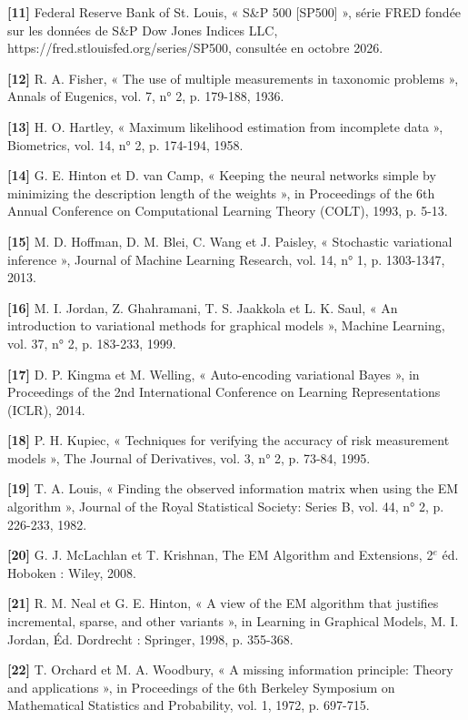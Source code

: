\textbf{[11]  }Federal Reserve Bank of St. Louis, « S\&P 500 [SP500] », série FRED fondée sur les données de S\&P Dow Jones Indices LLC, https://fred.stlouisfed.org/series/SP500, consultée en octobre 2026.

\textbf{[12]  }R. A. Fisher, « The use of multiple measurements in taxonomic problems », Annals of Eugenics, vol. 7, n° 2, p. 179-188, 1936.

\textbf{[13]  }H. O. Hartley, « Maximum likelihood estimation from incomplete data », Biometrics, vol. 14, n° 2, p. 174-194, 1958.

\textbf{[14]  }G. E. Hinton et D. van Camp, « Keeping the neural networks simple by minimizing the description length of the weights », in Proceedings of the 6th Annual Conference on Computational Learning Theory (COLT), 1993, p. 5-13.

\textbf{[15]  }M. D. Hoffman, D. M. Blei, C. Wang et J. Paisley, « Stochastic variational inference », Journal of Machine Learning Research, vol. 14, n° 1, p. 1303-1347, 2013.

\textbf{[16]  }M. I. Jordan, Z. Ghahramani, T. S. Jaakkola et L. K. Saul, « An introduction to variational methods for graphical models », Machine Learning, vol. 37, n° 2, p. 183-233, 1999.

\textbf{[17]  }D. P. Kingma et M. Welling, « Auto-encoding variational Bayes », in Proceedings of the 2nd International Conference on Learning Representations (ICLR), 2014.

\textbf{[18]  }P. H. Kupiec, « Techniques for verifying the accuracy of risk measurement models », The Journal of Derivatives, vol. 3, n° 2, p. 73-84, 1995.

\textbf{[19]  }T. A. Louis, « Finding the observed information matrix when using the EM algorithm », Journal of the Royal Statistical Society: Series B, vol. 44, n° 2, p. 226-233, 1982.

\textbf{[20]  }G. J. McLachlan et T. Krishnan, The EM Algorithm and Extensions, 2$^{e}$ éd. Hoboken : Wiley, 2008.

\textbf{[21]  }R. M. Neal et G. E. Hinton, « A view of the EM algorithm that justifies incremental, sparse, and other variants », in Learning in Graphical Models, M. I. Jordan, Éd. Dordrecht : Springer, 1998, p. 355-368.

\textbf{[22]  }T. Orchard et M. A. Woodbury, « A missing information principle: Theory and applications », in Proceedings of the 6th Berkeley Symposium on Mathematical Statistics and Probability, vol. 1, 1972, p. 697-715.

